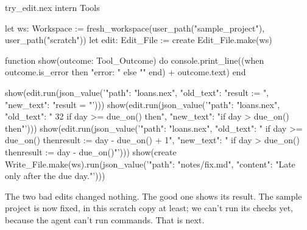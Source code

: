 \begin{tryit}{try_edit.nex}
intern Tools

let ws: Workspace := fresh_workspace(user_path("sample_project"), user_path("scratch"))
let edit: Edit_File := create Edit_File.make(ws)

function show(outcome: Tool_Outcome) do
  console.print_line((when outcome.is_error then "error: " else "" end) + outcome.text)
end

show(edit.run(json_value('{"path": "loans.nex", "old_text": "result := ", "new_text": "result = "}')))
show(edit.run(json_value('{"path": "loans.nex", "old_text": "   32      if day >= due_on() then", "new_text": "if day > due_on() then"}')))
show(edit.run(json_value('{"path": "loans.nex", "old_text": "    if day >= due_on() then\n      result := day - due_on() + 1", "new_text": "    if day > due_on() then\n      result := day - due_on()"}')))
show(create Write_File.make(ws).run(json_value('{"path": "notes/fix.md", "content": "Late only after the due day.\n"}')))
\end{tryit}

The two bad edits changed nothing. The good one shows its result. The
sample project is now fixed, in this scratch copy at least; we can't run
its checks yet, because the agent can't run commands. That is next.
